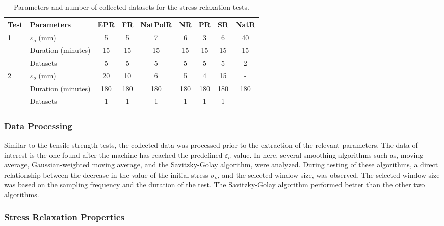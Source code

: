 \begin{table*}[htb!]
\centering
\caption{Parameters and number of collected datasets for the stress relaxation tests.}
\label{tbl:stressRelParameters}
\begin{tabular}{llccccccc} \toprule
Test & Parameters & EPR & FR & NatPolR & NR & PR & SR & NatR \\
\hline
\multirow{3}{*}{1}  & $\varepsilon_o$ (mm)      & 5 & 5 & 7 & 6 & 3 & 6 & 40 \\
                    & Duration (minutes)    & 15 & 15 & 15 & 15 & 15 & 15 & 15 \\
                    & Datasets              & 5 & 5 & 5 & 5 & 5 & 5 & 2 \\
\hline 
\multirow{3}{*}{2}  & $\varepsilon_o$ (mm)      & 20 & 10 & 6 & 5 & 4 & 15 & - \\
                    & Duration (minutes)    & 180 & 180 & 180 & 180 & 180 & 180 & 180 \\
                    & Datasets              & 1 & 1 & 1 & 1 & 1 & 1 & - \\
\bottomrule
\end{tabular}
\end{table*}

\subsubsection{Data Processing}

Similar to the tensile strength tests, the collected data was processed prior to the extraction of the relevant parameters. The data of interest is the one found after the machine has reached the predefined $\varepsilon_o$ value. In here, several smoothing algorithms such as, moving average, Gaussian-weighted moving average, and the Savitzky-Golay algorithm, were analyzed. During testing of these algorithms, a direct relationship between the decrease in the value of the initial stress $\sigma_o$, and the selected window size, was observed. The selected window size was based on the sampling frequency and the duration of the test. The Savitzky-Golay algorithm performed better than the other two algorithms.

\subsubsection{Stress Relaxation Properties}

